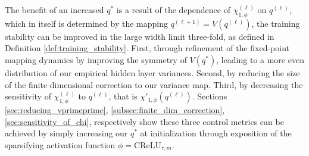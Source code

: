 \documentclass{article}
\theoremstyle{plain}
\theoremstyle{definition}
\theoremstyle{remark}
\begin{document}
 The benefit of an increased $q^*$ is a result of the dependence of $\chi_{1, \phi}^{(\ell)}$ on $q^{(\ell)}$, which in itself is determined by the mapping $q^{(\ell+1)} = V(q^{(\ell)})$, the training stability can be improved in the large width limit three-fold, as defined in Definition \ref{def:training_stability}. First, through refinement of the fixed-point mapping dynamics by improving the symmetry of $V(q^*)$, leading to a more even distribution of our empirical hidden layer variances. Second, by reducing the size of the finite dimensional correction to our variance map. Third, by decreasing the sensitivity of $\chi_{1, \phi}^{(\ell)}$ to $q^{(\ell)}$, that is $\chi'_{1, \phi}(q^{(\ell)})$. Sections \ref{sec:reducing_vprimeprime}, \ref{subsec:finite_dim_correction}, \ref{sec:sensitivity_of_chi}, respectively show these three control metrics can be achieved by simply increasing our $q^*$ at initialization through exposition of the sparsifying activation function $\phi = \text{CReLU}_{\tau, m}$.




\end{document}
